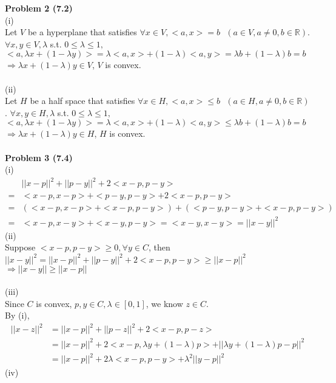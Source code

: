 \documentclass[letterpaper,12pt]{article}
\theoremstyle{definition}
\begin{document}
\noindent\textbf{Problem 2 (7.2)} \\
(i)\\
Let $V$ be a hyperplane that satisfies $\forall x\in V, <a, x> = b\text{  }(a\in V, a\neq 0, b\in\mathbb{R})$. $\forall x, y\in V, \lambda$ s.t. $0\leq \lambda \leq 1,$\\
$<a, \lambda x + (1-\lambda y)> = \lambda <a, x> + (1-\lambda)<a, y> = \lambda b +(1-\lambda)b = b$\\
$\Rightarrow \lambda x+(1-\lambda)y \in V$, $V$ is convex.\\
\\
(ii)\\
Let $H$ be a half space that satisfies $\forall x\in H, <a, x> \leq b\text{  }(a\in H, a\neq 0, b\in\mathbb{R})$. $\forall x, y\in H, \lambda$ s.t. $0\leq \lambda \leq 1,$\\
$<a, \lambda x + (1-\lambda y)> = \lambda <a, x> + (1-\lambda)<a, y> \leq \lambda b +(1-\lambda)b = b$\\
$\Rightarrow \lambda x+(1-\lambda)y \in H$, $H$ is convex.\\
\\
\noindent\textbf{Problem 3 (7.4)} \\
(i)
\begin{align*}
&||x-p||^2 + ||p-y||^2 +2<x-p, p-y> \\
= &<x-p, x-p> + <p-y, p-y> + 2<x-p,p-y>\\
= & (<x-p, x-p>+<x-p, p-y>) + (<p-y, p-y> + <x-p, p-y>)\\
= &<x-p, x-y> + <x-y, p-y> = <x-y, x-y> = ||x-y||^2
\end{align*}
(ii)\\
Suppose $<x-p, p-y>\geq 0, \forall y\in C$, then\\
$||x-y||^2 = ||x-p||^2 + ||p-y||^2 + 2<x-p, p-y>\geq ||x-p||^2$\\
$\Rightarrow ||x-y||\geq ||x-p||$\\
\\
(iii)\\
Since $C$ is convex, $p, y\in C, \lambda \in [0, 1]$, we know $z\in C$.\\
By (i), 
\begin{align*}
||x-z||^2 &= ||x-p||^2 + ||p-z||^2 + 2<x-p, p-z>\\
&= ||x-p||^2 + 2<x-p, \lambda y+(1-\lambda)p>+||\lambda y+(1-\lambda)p-p||^2\\
&= ||x-p||^2 + 2\lambda <x-p, p-y>+\lambda^2 ||y-p||^2
\end{align*}
(iv)\\
\end{document}
